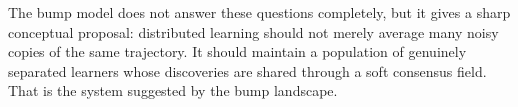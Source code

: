 \documentclass{article}
\begin{document}
The bump model does not answer these questions completely, but it gives
a sharp conceptual proposal: distributed learning should not merely
average many noisy copies of the same trajectory. It should maintain a
population of genuinely separated learners whose discoveries are shared
through a soft consensus field. That is the system suggested by the bump
landscape.



\end{document}
